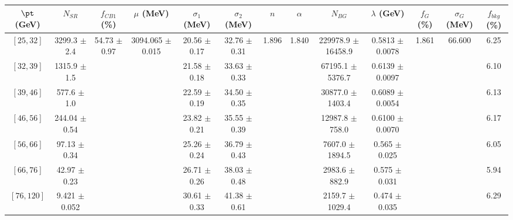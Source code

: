 \begin{tabular}{c||c|c|c|c|c|c|c|c|c|c|c||c}
$\pt$ (GeV) & $N_{SR}$ & $f_{CB1}$ (\%) & $\mu$ (MeV) & $\sigma_1$ (MeV) & $\sigma_2$ (MeV) & $n$ & $\alpha$ & $N_{BG}$ & $\lambda$ (GeV) & $f_G$ (\%) & $\sigma_G$ (MeV) & $f_{bkg}$ (\%) \\
\hline
$[25, 32]$ & 3299.3 $\pm$ 2.4 & \multirow{7}{*}{54.73 $\pm$ 0.97} & \multirow{7}{*}{3094.065 $\pm$ 0.015} & 20.56 $\pm$ 0.17 & 32.76 $\pm$ 0.31 & \multirow{7}{*}{1.896} & \multirow{7}{*}{1.840} & 229978.9 $\pm$ 16458.9 & 0.5813 $\pm$ 0.0078 & \multirow{7}{*}{1.861} & \multirow{7}{*}{66.600} & 6.25\\
$[32, 39]$ & 1315.9 $\pm$ 1.5 &  &  & 21.58 $\pm$ 0.18 & 33.63 $\pm$ 0.33 &  &  & 67195.1 $\pm$ 5376.7 & 0.6139 $\pm$ 0.0097 &  &  & 6.10\\
$[39, 46]$ & 577.6 $\pm$ 1.0 &  &  & 22.59 $\pm$ 0.19 & 34.50 $\pm$ 0.35 &  &  & 30877.0 $\pm$ 1403.4 & 0.6089 $\pm$ 0.0054 &  &  & 6.13\\
$[46, 56]$ & 244.04 $\pm$ 0.54 &  &  & 23.82 $\pm$ 0.21 & 35.55 $\pm$ 0.39 &  &  & 12987.8 $\pm$ 758.0 & 0.6100 $\pm$ 0.0070 &  &  & 6.17\\
$[56, 66]$ & 97.13 $\pm$ 0.34 &  &  & 25.26 $\pm$ 0.24 & 36.79 $\pm$ 0.43 &  &  & 7607.0 $\pm$ 1894.5 & 0.565 $\pm$ 0.025 &  &  & 6.05\\
$[66, 76]$ & 42.97 $\pm$ 0.23 &  &  & 26.71 $\pm$ 0.26 & 38.03 $\pm$ 0.48 &  &  & 2983.6 $\pm$ 882.9 & 0.575 $\pm$ 0.031 &  &  & 5.94\\
$[76, 120]$ & 9.421 $\pm$ 0.052 &  &  & 30.61 $\pm$ 0.33 & 41.38 $\pm$ 0.61 &  &  & 2159.7 $\pm$ 1029.4 & 0.474 $\pm$ 0.035 &  &  & 6.29\\
\end{tabular}
